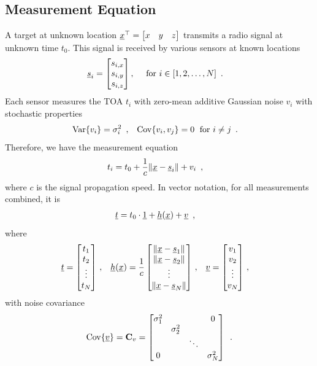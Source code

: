 \documentclass[conference]{IEEEtran}
\begin{document}
\subsection{Measurement Equation}
A target at unknown location 
$
    {\underline{x}}^\top = \begin{bmatrix}
    x & y & z
    \end{bmatrix}
$
transmits a radio signal at unknown time $t_0$. This signal is received by various sensors at known locations 
\begin{align}
    {\underline{s}}_i &= \begin{bmatrix}s_{i,x}\\ s_{i,y} \\ s_{i,z} \end{bmatrix} ,\quad \text{ for } i \in \mathopen{}\left[ 1,2,\hdots,N \right]\mathclose{} \enspace. 
\end{align}
Each sensor measures the \ac{TOA} $t_i$ with zero-mean additive Gaussian noise $v_i$ with stochastic properties 
\begin{align}
    \op{Var}\braces{v_i}&=\sigma_i^2\enspace, 
    & \Cov{v_i,v_j}&=0 \; \text{ for } i\neq j \enspace. 
\end{align}
%
%
Therefore, we have the measurement equation 
\begin{align}
    t_i &= t_0 + \frac{1}{c}\mathopen{}\left\| {\underline{x}}-{\underline{s}}_i \right\|\mathclose{} + v_i \enspace, \label{eq:MeasurementEq}
\end{align}
where $c$ is the signal propagation speed. In vector notation, for all measurements combined, it is 
\begin{align}
    {\underline{t}} &= t_0 \cdot \underline{1} + \underline{h}({\underline{x}}) + {\underline{v}} \enspace, \label{eq:MeasurementEqVec}
\end{align}
where 
\begin{align}
    {\underline{t}} &= \begin{bmatrix}
        t_1 \\ t_2 \\ \vdots \\ t_N
    \end{bmatrix} \,, & 
    \underline{h}({\underline{x}}) &= \frac{1}{c} \begin{bmatrix}
        \mathopen{}\left\| {\underline{x}}-{\underline{s}}_1 \right\|\mathclose{} \\
        \mathopen{}\left\| {\underline{x}}-{\underline{s}}_2 \right\|\mathclose{} \\
        \vdots  \\ 
        \mathopen{}\left\| {\underline{x}}-{\underline{s}}_N \right\|\mathclose{} 
    \end{bmatrix} \,, &
    {\underline{v}} &= \begin{bmatrix}
        v_1 \\ v_2 \\ \vdots \\ v_N
    \end{bmatrix} \,,
\end{align}
with noise covariance 
\begin{align}
    \Cov{\v} = \mat C_v = \begin{bmatrix}
        \sigma_1^2 & & & 0 \\
         &  \sigma_2^2 \\ 
         & & \ddots \\ 
         0 & & & \sigma_N^2
    \end{bmatrix} \enspace. \label{eq:MeasurementEq:Cov}
\end{align}
\end{document}
